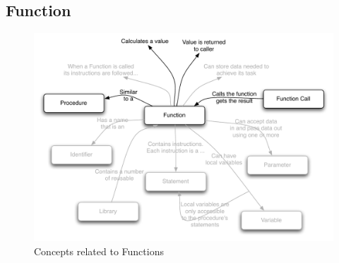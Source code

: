 \clearpage
\subsection{Function} %
\label{sub:function}

\begin{figure}[h]
\includegraphics[width=\textwidth]{topics/function-decl/diagrams/Function} 
 \caption{Concepts related to Functions}
 \label{fig:function-decl-function}
\end{figure}


